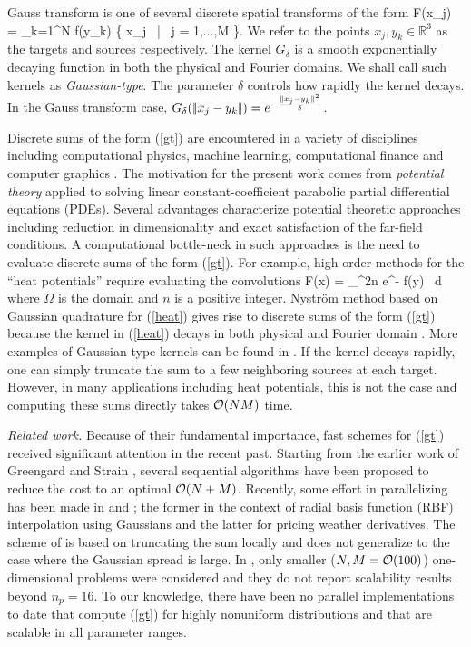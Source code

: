 
Gauss transform is one of several discrete spatial transforms of the form 
%
\beq F(x_j) = \sum_{k=1}^N  f(y_k) \quad {} \quad \{ x_j \, | \, j = 1,...,M \}.  \label{gt} \eeq
%
We refer to the points $ x_j, y_k \in \mathbb{R}^3 $ as the targets and sources respectively. The kernel $G_\delta$ is a
 smooth exponentially decaying function in both the physical and Fourier domains. We shall call such kernels as {\em Gaussian-type}.
  The parameter $\delta$ controls how rapidly the kernel decays.  In the Gauss transform case, $G_\delta (|\!| x_j - y_k |\!|) = e^{-\frac{|\!| x_j - y_k |\!|^2}{\delta}}$. 

Discrete sums of the form (\ref{gt}) are encountered in a variety of disciplines including computational physics,
 machine learning, computational finance and computer graphics \cite{strain94adap, elgammal03, broadie03, kim05, veerapaneni08}. The
 motivation for the present work comes from {\em potential theory} \cite{kress99} applied to  solving linear constant-coefficient
 parabolic partial differential equations (PDEs). Several advantages characterize potential theoretic approaches including reduction
 in dimensionality and exact satisfaction of the far-field conditions. A computational bottle-neck in such approaches is the need to 
 evaluate discrete sums of the form (\ref{gt}). For example, high-order methods for the ``heat potentials'' require evaluating the convolutions \cite{li09, skv09}
% 
\beq F(x) = \int_\Omega {}^{2n} e^{-} f(y) \, d\Omega \label{heat} \eeq
% 
where $\Omega$ is the domain and $n$ is a positive integer. Nystr\"{o}m method based on Gaussian quadrature for (\ref{heat}) 
gives rise to discrete sums of the form (\ref{gt}) because the kernel in (\ref{heat}) decays in both physical and Fourier 
domain \cite{fggt}. More examples of Gaussian-type kernels can be found in \cite{victor03}. If the kernel decays rapidly, one 
can simply truncate the sum to a few neighboring sources at each target. However, in many applications including heat potentials, this
 is not the case and computing these sums directly takes $\mathcal{O}(NM)$ time. 

{\em Related work.} Because of their fundamental importance, fast schemes for (\ref{gt}) received significant attention in 
the recent past. Starting from the earlier work of Greengard and Strain \cite{fgt}, several sequential
 algorithms \cite{greengard98, sun02, duraiswami03, tausch09, fggt} have been proposed to reduce the cost to an optimal $\mathcal{O}(N+M)$. Recently,
  some effort in parallelizing has been made in \cite{rio09} and \cite{yusaku06}; the former in the context of radial basis 
  function (RBF) interpolation using Gaussians and the latter for pricing weather derivatives. The scheme of \cite{rio09} is based on 
  truncating the sum locally and does not generalize to the case where the Gaussian spread is large. In \cite{yusaku06}, only
   smaller ($N, M = \mathcal{O}(100)$) one-dimensional problems were considered and they do not report scalability results beyond $n_p = 16$. 
To our knowledge, there have been no parallel implementations to date that compute (\ref{gt}) for highly nonuniform
 distributions and that are scalable in all parameter ranges. 

